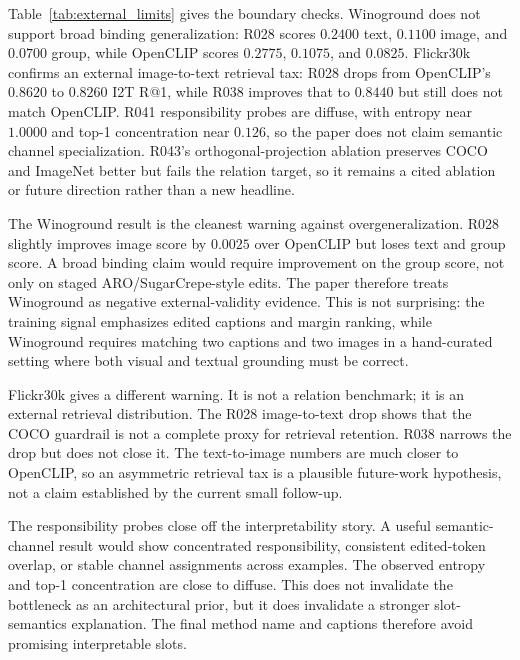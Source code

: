Table~\ref{tab:external_limits} gives the boundary checks. Winoground does not support broad binding generalization: R028 scores $0.2400$ text, $0.1100$ image, and $0.0700$ group, while OpenCLIP scores $0.2775$, $0.1075$, and $0.0825$. Flickr30k confirms an external image-to-text retrieval tax: R028 drops from OpenCLIP's $0.8620$ to $0.8260$ I2T R@1, while R038 improves that to $0.8440$ but still does not match OpenCLIP. R041 responsibility probes are diffuse, with entropy near $1.0000$ and top-1 concentration near $0.126$, so the paper does not claim semantic channel specialization. R043's orthogonal-projection ablation preserves COCO and ImageNet better but fails the relation target, so it remains a cited ablation or future direction rather than a new headline.

The Winoground result is the cleanest warning against overgeneralization. R028 slightly improves image score by $0.0025$ over OpenCLIP but loses text and group score. A broad binding claim would require improvement on the group score, not only on staged ARO/SugarCrepe-style edits. The paper therefore treats Winoground as negative external-validity evidence. This is not surprising: the training signal emphasizes edited captions and margin ranking, while Winoground requires matching two captions and two images in a hand-curated setting where both visual and textual grounding must be correct.

Flickr30k gives a different warning. It is not a relation benchmark; it is an external retrieval distribution. The R028 image-to-text drop shows that the COCO guardrail is not a complete proxy for retrieval retention. R038 narrows the drop but does not close it. The text-to-image numbers are much closer to OpenCLIP, so an asymmetric retrieval tax is a plausible future-work hypothesis, not a claim established by the current small follow-up.

The responsibility probes close off the interpretability story. A useful semantic-channel result would show concentrated responsibility, consistent edited-token overlap, or stable channel assignments across examples. The observed entropy and top-1 concentration are close to diffuse. This does not invalidate the bottleneck as an architectural prior, but it does invalidate a stronger slot-semantics explanation. The final method name and captions therefore avoid promising interpretable slots.
